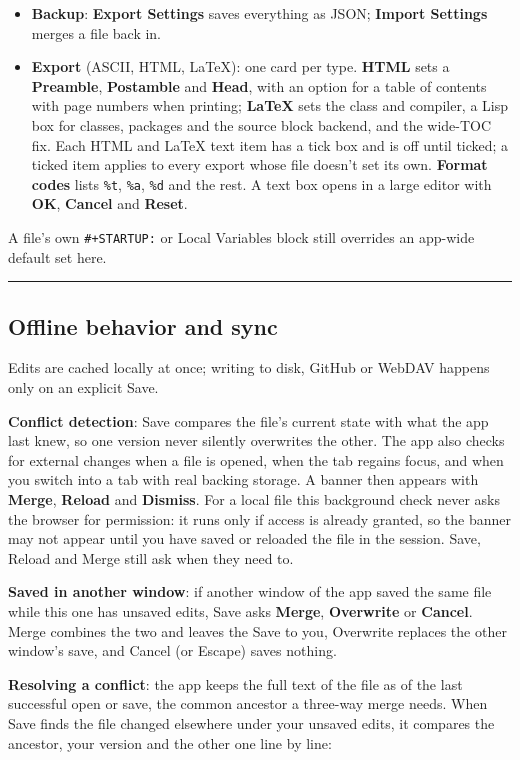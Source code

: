 \documentclass[11pt]{article}
\begin{document}
\begin{itemize}
\item \textbf{Backup}: \textbf{Export Settings} saves everything as JSON; \textbf{Import Settings} merges a file back in.
\item \textbf{Export} (ASCII, HTML, \LaTeX{}): one card per type. \textbf{HTML} sets a \textbf{Preamble}, \textbf{Postamble} and \textbf{Head}, with an option for a table of contents with page numbers when printing; \textbf{\LaTeX{}} sets the class and compiler, a Lisp box for classes, packages and the source block backend, and the wide-TOC fix. Each HTML and \LaTeX{} text item has a tick box and is off until ticked; a ticked item applies to every export whose file doesn't set its own. \textbf{Format codes} lists \texttt{\%t}, \texttt{\%a}, \texttt{\%d} and the rest. A text box opens in a large editor with \textbf{OK}, \textbf{Cancel} and \textbf{Reset}.
\end{itemize}

A file's own \texttt{\#+STARTUP:} or Local Variables block still overrides an app-wide default set here.

\noindent\rule{\textwidth}{0.5pt}

\subsection{Offline behavior and sync}
\label{sec:org1ff17da}
Edits are cached locally at once; writing to disk, GitHub or WebDAV happens only on an explicit Save.

\textbf{Conflict detection}: Save compares the file's current state with what the app last knew, so one version never silently overwrites the other. The app also checks for external changes when a file is opened, when the tab regains focus, and when you switch into a tab with real backing storage. A banner then appears with \textbf{Merge}, \textbf{Reload} and \textbf{Dismiss}. For a local file this background check never asks the browser for permission: it runs only if access is already granted, so the banner may not appear until you have saved or reloaded the file in the session. Save, Reload and Merge still ask when they need to.

\textbf{Saved in another window}: if another window of the app saved the same file while this one has unsaved edits, Save asks \textbf{Merge}, \textbf{Overwrite} or \textbf{Cancel}. Merge combines the two and leaves the Save to you, Overwrite replaces the other window's save, and Cancel (or Escape) saves nothing.

\textbf{Resolving a conflict}: the app keeps the full text of the file as of the last successful open or save, the common ancestor a three-way merge needs. When Save finds the file changed elsewhere under your unsaved edits, it compares the ancestor, your version and the other one line by line:
\end{document}
